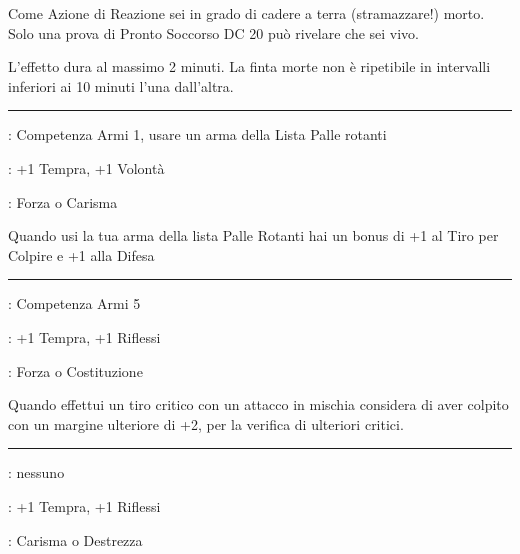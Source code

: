 \begin{multicols}{2}
Come Azione di Reazione sei in grado di cadere a terra (stramazzare!) morto. Solo una prova di Pronto Soccorso DC 20 può rivelare che sei vivo.

L'effetto dura al massimo 2 minuti. La finta morte non è ripetibile in intervalli inferiori ai 10 minuti l'una dall'altra.

\smallskip\noindent\rule{\linewidth}{2pt} \hypertarget{Flagello Danzante}{}\medskip{}
\noindent
\begin{description}[noitemsep, topsep=0pt, parsep=0pt, partopsep=0pt, leftmargin=0cm, labelwidth=2.5cm]
    \item[\textbf{Requisito}]: Competenza Armi 1, usare un arma della Lista Palle rotanti
    \item[\textbf{Tiri Salvezza}]: +1 Tempra, +1 Volontà
    \item[\textbf{Caratteristica}]: Forza o Carisma
\end{description}

Quando usi la tua arma della lista Palle Rotanti hai un bonus di +1 al Tiro per Colpire e +1 alla Difesa

\smallskip\noindent\rule{\linewidth}{2pt} \hypertarget{Forgiato nella furia}{}\medskip{}
\noindent
\begin{description}[noitemsep, topsep=0pt, parsep=0pt, partopsep=0pt, leftmargin=0cm, labelwidth=2.5cm]
    \item[\textbf{Requisito}]: Competenza Armi 5
    \item[\textbf{Tiri Salvezza}]: +1 Tempra, +1 Riflessi
    \item[\textbf{Caratteristica}]: Forza o Costituzione
\end{description}

Quando effettui un tiro critico con un attacco in mischia considera di aver colpito con un margine ulteriore di +2, per la verifica di ulteriori critici.

\smallskip\noindent\rule{\linewidth}{2pt} \hypertarget{Fortunato}{}\medskip{}
\noindent
\begin{description}[noitemsep, topsep=0pt, parsep=0pt, partopsep=0pt, leftmargin=0cm, labelwidth=2.5cm]
    \item[\textbf{Requisito}]: nessuno
    \item[\textbf{Tiri Salvezza}]: +1 Tempra, +1 Riflessi
    \item[\textbf{Caratteristica}]: Carisma o Destrezza
\end{description}


\end{multicols}
